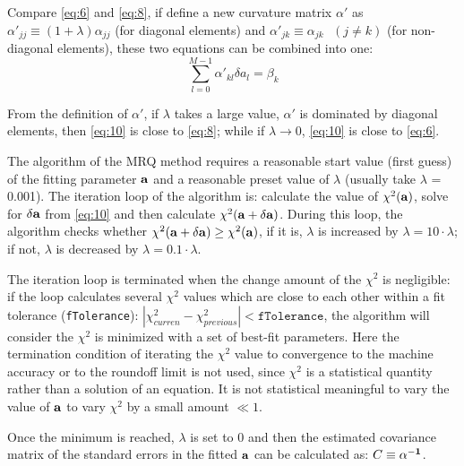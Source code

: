 Compare \ref{eq:6} and \ref{eq:8}, if define a new curvature matrix $\alpha'$ as $\alpha'_{jj}\equiv (1+\lambda)\alpha_{jj}$ (for diagonal  elements) and $\alpha'_{jk}\equiv \alpha_{jk}~~~(j\neq k)$ (for non-diagonal elements), these two equations can be combined into one: 
\begin{equation}\label{eq:10}
\sum_{l=0}^{M-1}\alpha'_{kl}\delta a_l = \beta_k
\end{equation}

From the definition of $\alpha'$, if $\lambda$ takes a large value, $\alpha'$ is dominated by diagonal elements, then \ref{eq:10} is close to \ref{eq:8}; while if $\lambda\to0$,  \ref{eq:10} is close to \ref{eq:6}.

The algorithm of the MRQ method requires a reasonable start value (first guess) of the fitting parameter $\bf a$ and a reasonable preset value of $\lambda$ (usually take $\lambda$ = 0.001). 
The iteration loop of the algorithm is: calculate the value of $\chi^2({\bf a})$, solve for $\bf \delta a$ from \ref{eq:10} and then calculate $\chi^2({\bf a+\delta a})$. During this loop, the algorithm checks whether $\chi^2({\bf a+\delta a})\geq\chi^2({\bf a})$, if it is, $\lambda$ is increased by $\lambda=10\cdot\lambda$; if not, $\lambda$ is decreased by $\lambda=0.1\cdot\lambda$.  

The iteration loop is terminated when the change amount of the $\chi^2$ is negligible: if the loop calculates several $\chi^2$ values which are close to each other within a fit tolerance (\texttt{fTolerance}): $|\chi^2_{curren}-\chi^2_{previous}|<\texttt{fTolerance}$, the algorithm will consider the $\chi^2$ is minimized with a set of best-fit parameters. Here the termination condition of iterating the $\chi^2$ value to convergence to the machine
accuracy or to the roundoff limit is not used, since $\chi^2$ is a statistical quantity rather than a solution of an equation. It is not statistical meaningful to vary the value of $\bf a$ to vary $\chi^2$ by a small amount $\ll 1$.

Once the minimum is reached, $\lambda$ is set to 0 and then the estimated covariance matrix of the standard errors in the fitted $\bf a$ can be calculated as: $C\equiv {\bf \alpha^{-1}}$.

